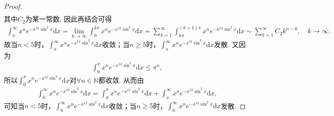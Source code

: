 \documentclass[../../main.tex]{subfiles}%
\begin{document}
\begin{proof}
\begin{align*}
\end{align*}
其中$C_2$为某一常数. 因此再结合可得
\begin{align*}
\int_{\pi}^{\infty}{x^ne^{-x^{12}\sin ^2x}\mathrm{d}x}=\underset{k\rightarrow \infty}{\lim}\int_0^{k\pi}{x^ne^{-x^{12}\sin ^2x}\mathrm{d}x}=\sum_{k=1}^{\infty}{\int_{k\pi}^{(k+1)\pi}{x^ne^{-x^{12}\sin ^2x}\mathrm{d}x}}\sim \sum_{k=1}^{\infty}{C_2k^{n-6},\quad k\rightarrow \infty}.
\end{align*}
故当$n<5$时，$\int_{\pi}^{\infty}x^ne^{-x^{12}\sin^2x}\mathrm{d}x$收敛；当$n\geqslant 5$时，$\int_{\pi}^{\infty}x^ne^{-x^{12}\sin^2x}\mathrm{d}x$发散. 又因为
\begin{align*}
\int_0^{\pi}x^ne^{-x^{12}\sin^2x}\mathrm{d}x\leqslant \pi^n,
\end{align*}
所以$\int_0^{\pi}x^ne^{-x^{12}\sin^2x}\mathrm{d}x$对$\forall n\in \mathbb{N}$都收敛. 从而由
\begin{align*}
\int_0^{\infty}x^ne^{-x^{12}\sin^2x}\mathrm{d}x=\int_0^{\pi}x^ne^{-x^{12}\sin^2x}\mathrm{d}x+\int_{\pi}^{\infty}x^ne^{-x^{12}\sin^2x}\mathrm{d}x,
\end{align*}
可知当$n<5$时，$\int_0^{\infty}x^ne^{-x^{12}\sin^2x}\mathrm{d}x$收敛；当$n\geqslant 5$时，$\int_0^{\infty}x^ne^{-x^{12}\sin^2x}\mathrm{d}x$发散.
\end{proof}
\end{document}
